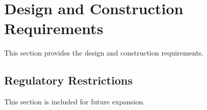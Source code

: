 \KNEADSECTIONNEWPAGE
\section{Design and Construction Requirements}
\label{lab:sec_DesignConstructionRequirements}
% 

This section provides the \ThisSys design and construction requirements. 

\KNEADSUBSECTIONNEWPAGE
\subsection{Regulatory Restrictions}
\label{lab:ssec_RegulatoryRestrictions}

This section is included for future expansion.






% 




% 